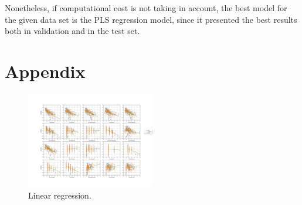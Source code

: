 Nonetheless, if computational cost is not taking in account, the best model for the given data set is the PLS regression model, since it presented the best results both in validation and in the test set.

\section*{Appendix}
\begin{figure}[htbp!]
  \centerline{\includegraphics[width=0.5\textwidth]{../../code/hw2/figures/2-linear-regression.pdf}}
  \caption{Linear regression.}
  \label{fig:2-linear-regression}
\end{figure}

